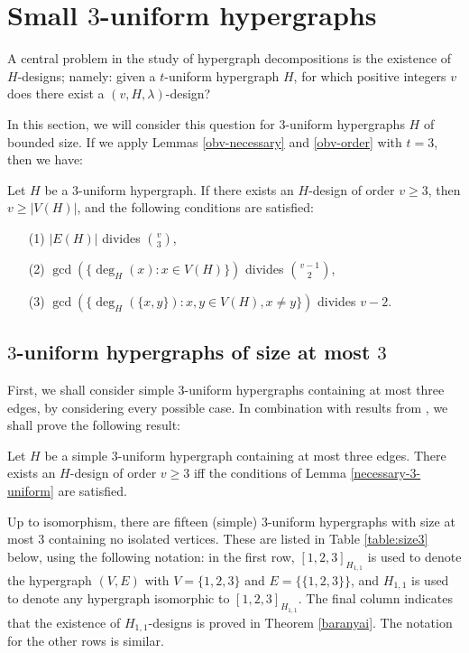 \section{Small $3$-uniform hypergraphs} \label{section:small-h}

A central problem in the study of hypergraph decompositions is the existence of
$H$-designs; namely: given a $t$-uniform hypergraph $H$, for which positive
integers $v$ does there exist a $(v, H, \lambda)$-design?

In this section, we will consider this question for $3$-uniform hypergraphs $H$ of bounded size.
If we apply Lemmas \ref{obv-necessary} and \ref{obv-order} with $t = 3$, then we have:

\begin{lemma} \label{necessary-3-uniform}
Let $H$ be a $3$-uniform hypergraph.
If there exists an $H$-design of order $v \geq 3$, then $v \geq |V(H)|$, and the following conditions are satisfied:
\begin{enumerate}
    \item[(1)] $|E(H)|$ divides ${v \choose 3}$,
    \item[(2)] $\gcd(\{\deg_H(x) : x \in V(H)\})$ divides ${v-1 \choose 2}$,
    \item[(3)] $\gcd(\{\deg_H(\{x,y\}) : x, y \in V(H), x \neq y\})$ divides $v-2$.
\end{enumerate}
\end{lemma}

\subsection{$3$-uniform hypergraphs of size at most $3$}

First, we shall consider simple $3$-uniform hypergraphs containing at most three edges, by considering every possible case.
In combination with results from \cite{baran, bryant, feng-chang2, hanani}, we shall prove the following result:

\begin{theorem} \label{thm:size-le3}
Let $H$ be a simple $3$-uniform hypergraph containing at most three edges.
There exists an $H$-design of order $v \geq 3$ iff the conditions of Lemma \ref{necessary-3-uniform} are satisfied.
\end{theorem}

Up to isomorphism, there are fifteen (simple) $3$-uniform hypergraphs with size at most 3 containing no isolated vertices.
These are listed in Table \ref{table:size3} below, using the following notation: in the first row, $[1, 2, 3]_{H_{1,1}}$ is used to denote the hypergraph $(V, E)$ with $V = \{1, 2, 3\}$ and $E = \{\{1, 2, 3\}\}$, and $H_{1,1}$ is used to denote any hypergraph isomorphic to $[1, 2, 3]_{H_{1,1}}$.
The final column indicates that the existence of $H_{1,1}$-designs is proved in Theorem \ref{baranyai}.
The notation for the other rows is similar.

